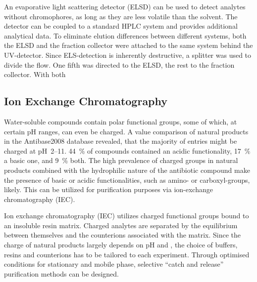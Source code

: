 An evaporative light scattering detector (ELSD) can be used to detect analytes without chromophores, as long as they are less volatile than the solvent.\autocite{Mathews2004,Righezza1988,Mourey1984,Charlesworth1978}
The detector can be coupled to a standard HPLC system and provides additional analytical data.
To eliminate elution differences between different systems, both the ELSD and the fraction collector were attached to the same system behind the UV-detector.
Since ELS-detection is inherently destructive, a splitter was used to divide the flow. One fifth was directed to the ELSD, the rest to the fraction collector.
With both



\subsection{Ion Exchange Chromatography} %
\label{sub:results_ion_exchange_chromatography}

Water-soluble compounds contain polar functional groups, some of which, at certain pH ranges, can even be charged.
A \pka value comparison of natural products in the Antibase2008 database revealed, that the majority of entries might be charged at pH~2--11.\autocite{Mansson2010}
44~\% of compounds contained an acidic functionality, 17~\% a basic one, and 9~\% both.
The high prevalence of charged groups in natural products combined with the
hydrophilic nature of the antibiotic compound make the presence of basic or
acidic functionalities, such as amino- or carboxyl-groups, likely.
This can be utilized for purification purposes via ion-exchange chromatography (IEC).

Ion exchange chromatography (IEC) utilizes charged functional groups bound to an insoluble resin matrix.\autocite{Dragull2012}
Charged analytes are separated by the equilibrium between themselves and the counterions associated with the matrix.
Since the charge of natural products largely depends on pH and \pka, the choice of buffers, resins and counterions has
to be tailored to each experiment.
Through optimised conditions for stationary and mobile phase, selective ``catch and release'' purification methods can be designed.

